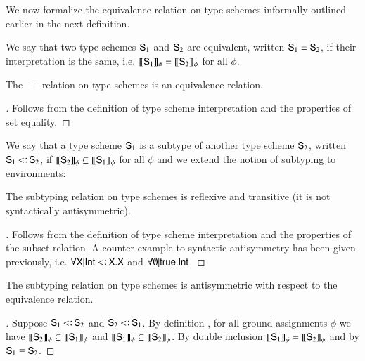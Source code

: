 \documentclass{report}
\begin{document}
  We now formalize the equivalence relation on type schemes informally
  outlined earlier in the next definition.
  \begin{dfn}
    We say that two type schemes $\type{S}_1$ and $\type{S}_2$ are equivalent,
    written $\type{S}_1\equiv\type{S}_2$, if their interpretation is the same,
    i.e. $\sinterp{\type{S}_1} = \sinterp{\type{S}_2}$ for all $\phi$.
  \end{dfn}
  \begin{lemma}
    The $\equiv$ relation on type schemes is an equivalence relation.
  \end{lemma}
  \begin{proof}[]
    Follows from the definition of type scheme interpretation 
    and the properties of set equality. 
  \end{proof}
  \begin{dfn}
    We say that a type scheme $\type{S}_1$ is a subtype of another type scheme
    $\type{S}_2$, written $\type{S}_1\subtype\type{S}_2$, if
    $\sinterp{\type{S}_2}\subseteq\sinterp{\type{S}_1}$ for all $\phi$ and we
    extend the notion of subtyping to environments:
    \begin{mathpar}
    \end{mathpar}
  \end{dfn}
  \begin{lemma}
    The subtyping relation on type schemes is reflexive and transitive (it is not syntactically antisymmetric).
  \end{lemma}
  \begin{proof}[]
    Follows from the definition of type scheme interpretation 
    and the properties of the subset relation. A counter-example to syntactic antisymmetry
    has been given previously, i.e. $\forall\type{X}|\Int\subtype\type{X}.\type{X}$
    and $\forall\emptyset|\true.\Int$.
  \end{proof}
  \begin{lemma}
    The subtyping relation on type schemes is antisymmetric with respect to the equivalence relation.
  \end{lemma}
  \begin{proof}[]
    Suppose $\type{S}_1\subtype\type{S}_2$ and $\type{S}_2\subtype\type{S}_1$. By definition
    , for all ground assignments $\phi$ we have
    $\sinterp{\type{S}_2}\subseteq\sinterp{\type{S}_1}$ and
    $\sinterp{\type{S}_1}\subseteq\sinterp{\type{S}_2}$. By double inclusion
    $\sinterp{\type{S}_1}=\sinterp{\type{S}_2}$ and by  $\type{S}_1\equiv\type{S}_2$.
  \end{proof}
\end{document}
